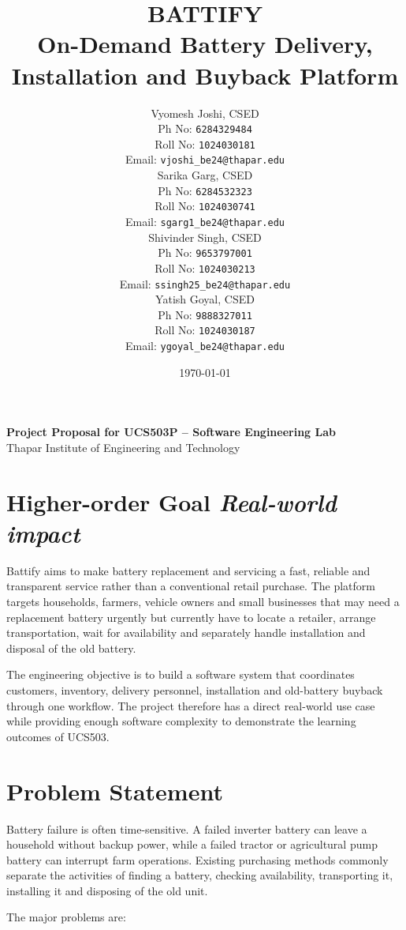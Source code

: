 \documentclass[11pt,a4paper]{article}
\title{\textbf{BATTIFY}\\
\large On-Demand Battery Delivery, Installation and Buyback Platform}
\author{
Vyomesh Joshi, CSED\\
Ph No: \texttt{6284329484}\\
Roll No: \texttt{1024030181}\\
Email: \texttt{vjoshi\_be24@thapar.edu}\\[4pt]
Sarika Garg, CSED\\
Ph No: \texttt{6284532323}\\
Roll No: \texttt{1024030741}\\
Email: \texttt{sgarg1\_be24@thapar.edu}\\[4pt]
Shivinder Singh, CSED\\
Ph No: \texttt{9653797001}\\
Roll No: \texttt{1024030213}\\
Email: \texttt{ssingh25\_be24@thapar.edu}\\[4pt]
Yatish Goyal, CSED\\
Ph No: \texttt{9888327011}\\
Roll No: \texttt{1024030187}\\
Email: \texttt{ygoyal\_be24@thapar.edu}
}
\date{\today}
\newcommand{\BvrHint}[1]{{\normalfont\normalsize\itshape\hfill #1}}
\begin{document}
\maketitle

\begin{center}
\textbf{\color{BattifyAccent} Project Proposal for UCS503P -- Software Engineering Lab}\\
Thapar Institute of Engineering and Technology
\end{center}

\section{Higher-order Goal \BvrHint{Real-world impact}}

Battify aims to make battery replacement and servicing a fast, reliable and
transparent service rather than a conventional retail purchase. The platform
targets households, farmers, vehicle owners and small businesses that may need
a replacement battery urgently but currently have to locate a retailer,
arrange transportation, wait for availability and separately handle
installation and disposal of the old battery.

The engineering objective is to build a software system that coordinates
customers, inventory, delivery personnel, installation and old-battery
buyback through one workflow. The project therefore has a direct real-world
use case while providing enough software complexity to demonstrate the
learning outcomes of UCS503.

\section{Problem Statement}

Battery failure is often time-sensitive. A failed inverter battery can leave a
household without backup power, while a failed tractor or agricultural pump
battery can interrupt farm operations. Existing purchasing methods commonly
separate the activities of finding a battery, checking availability,
transporting it, installing it and disposing of the old unit.

The major problems are:
\end{document}
